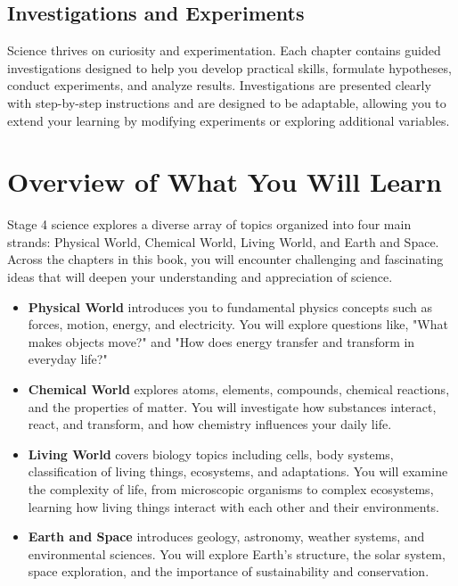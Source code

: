 \subsection{Investigations and Experiments}

Science thrives on curiosity and experimentation. Each chapter contains guided investigations designed to help you develop practical skills, formulate hypotheses, conduct experiments, and analyze results. Investigations are presented clearly with step-by-step instructions and are designed to be adaptable, allowing you to extend your learning by modifying experiments or exploring additional variables.

\section{Overview of What You Will Learn}

Stage 4 science explores a diverse array of topics organized into four main strands: Physical World, Chemical World, Living World, and Earth and Space. Across the chapters in this book, you will encounter challenging and fascinating ideas that will deepen your understanding and appreciation of science.

\begin{itemize}
    \item \textbf{Physical World} introduces you to fundamental physics concepts such as forces, motion, energy, and electricity. You will explore questions like, "What makes objects move?" and "How does energy transfer and transform in everyday life?"
    \item \textbf{Chemical World} explores atoms, elements, compounds, chemical reactions, and the properties of matter. You will investigate how substances interact, react, and transform, and how chemistry influences your daily life.
    \item \textbf{Living World} covers biology topics including cells, body systems, classification of living things, ecosystems, and adaptations. You will examine the complexity of life, from microscopic organisms to complex ecosystems, learning how living things interact with each other and their environments.
    \item \textbf{Earth and Space} introduces geology, astronomy, weather systems, and environmental sciences. You will explore Earth's structure, the solar system, space exploration, and the importance of sustainability and conservation.
\end{itemize}

